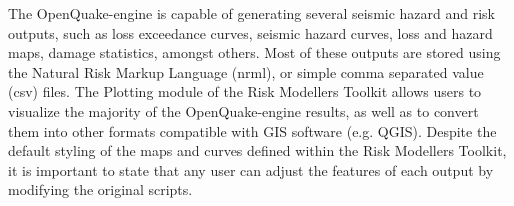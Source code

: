 The OpenQuake-engine is capable of generating several seismic hazard and risk outputs, such as loss exceedance curves, seismic hazard curves, loss and hazard maps, damage statistics, amongst others. Most of these outputs are stored using the Natural Risk Markup Language (nrml), or simple comma separated value (csv) files. The Plotting module of the Risk Modellers Toolkit allows users to visualize the majority of the OpenQuake-engine results, as well as to convert them into other formats compatible with GIS software (e.g. QGIS). Despite the default styling of the maps and curves defined within the Risk Modellers Toolkit, it is important to state that any user can adjust the features of each output by modifying the original scripts.